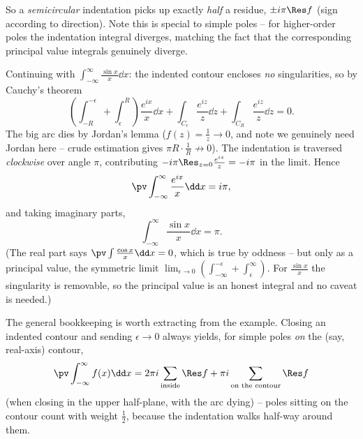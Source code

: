 So a \emph{semicircular} indentation picks up exactly \emph{half} a residue, $\pm i\pi \Res f$ (sign according to direction). Note this is special to simple poles -- for higher-order poles the indentation integral diverges, matching the fact that the corresponding principal value integrals genuinely diverge.

\begin{example}
	Continuing with $\int_{-\infty}^\infty \frac{\sin x}{x} \dd x$: the indented contour encloses \emph{no} singularities, so by Cauchy's theorem
	$$
	\left(\int_{-R}^{-\epsilon} + \int_\epsilon^R\right) \frac{e^{ix}}{x} \dd x + \int_{C_\epsilon} \frac{e^{iz}}{z} \dd z + \int_{C_R} \frac{e^{iz}}{z} \dd z = 0.
	$$
	The big arc dies by Jordan's lemma ($f(z) = \frac 1z \to 0$, and note we genuinely need Jordan here -- crude estimation gives $\pi R \cdot \frac 1R \not\to 0$). The indentation is traversed \emph{clockwise} over angle $\pi$, contributing $-i\pi \Res_{z=0} \frac{e^{iz}}{z} = -i\pi$ in the limit. Hence
	$$
	\pv \int_{-\infty}^\infty \frac{e^{ix}}{x} \dd x = i\pi,
	$$
	and taking imaginary parts,
	$$
	\int_{-\infty}^\infty \frac{\sin x}{x} \dd x = \pi.
	$$
	(The real part says $\pv \int \frac{\cos x}{x} \dd x = 0$, which is true by oddness -- but only as a principal value, the symmetric limit $\lim_{\epsilon \to 0} (\int_{-\infty}^{-\epsilon} + \int_\epsilon^\infty)$. For $\frac{\sin x}{x}$ the singularity is removable, so the principal value is an honest integral and no caveat is needed.)
\end{example}

The general bookkeeping is worth extracting from the example. Closing an indented contour and sending $\epsilon \to 0$ always yields, for simple poles \emph{on} the (say, real-axis) contour,
$$
\pv \int_{-\infty}^\infty f(x) \dd x = 2\pi i \sum_{\text{inside}} \Res f + \pi i \sum_{\text{on the contour}} \Res f
$$
(when closing in the upper half-plane, with the arc dying) -- poles sitting on the contour count with weight $\frac 12$, because the indentation walks half-way around them.

